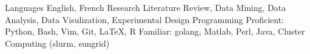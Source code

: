 \begin{cvskills}
	\cvskill
		{Languages}
		{English, French}
	\cvskill
		{Research}
        {Literature Review, Data Mining, Data Analysis, Data Visulization, Experimental Design}
	\cvskill
    	{Programming} %
    	{Proficient: Python, Bash, Vim, Git, LaTeX, R} %
	\cvskill
    	{} %
        {Familiar: golang, Matlab, Perl, Java, Cluster Computing (slurm, sungrid)}
\end{cvskills}

